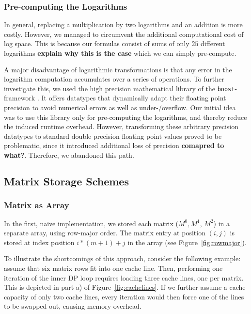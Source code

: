 \documentclass[runningheads,a4paper]{llncs}
\begin{document}
\subsubsection{Pre-computing the Logarithms}
In general, replacing a multiplication by two logarithms and an addition is more costly. 
However, we managed to circumvent the additional computational cost of log space. 
This is because our formulas consist of sums of only $25$ different logarithms {\bf explain why this is the case} which we can simply 
pre-compute.

A major disadvantage of logarithmic transformations is that any error in the logarithm computation accumulates over a series of operations. 
To further investigate this, we used the high precision mathematical library of the \texttt{boost}-framework \cite{boost}. 
It offers datatypes that dynamically adapt their floating point precision to avoid numerical errors as well as under-/overflow. 
Our initial idea was to use this library only for pre-computing the logarithms, and thereby reduce the induced runtime overhead. 
However, transforming these arbitrary precision datatypes to standard double precision floating point values proved to be problematic, since 
it introduced additional loss of precision {\bf comapred to what?}. Therefore,  we abandoned this path.

\subsection{Matrix Storage Schemes}
\label{sec:caching}

\subsubsection{Matrix as Array}
In the first, na\"ive implementation, we stored each matrix ($M^0, M^1$, $M^2$) in a separate array, using row-major order. 
The matrix entry at position $(i,j)$ is stored at index position $i*(m+1)+j$ in the array (see Figure~\ref{fig:rowmajor}).

To illustrate the shortcomings of this approach, consider the following example: assume that six matrix rows fit into one cache line. 
Then, performing one iteration of the inner DP loop requires loading three cache lines, one per matrix. 
This is depicted in part a) of Figure~\ref{fig:cachelines}.
If we further assume a cache capacity of only two cache lines, 
every iteration would then force one of the lines to be swapped out, causing memory overhead.
\end{document}

